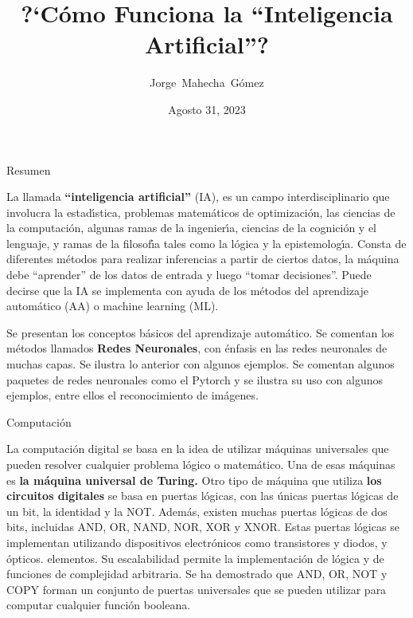 \documentclass[10pd,hyperref={colorlinks=true}]{beamer}
\title{\bf ?`C\'omo Funciona la ``Inteligencia Artificial''?}
\author[] %
{\scriptsize Jorge~Mahecha~G\'omez\inst{}
\vspace{-0.5cm}}
\institute{
\it Grupo de F\'{\i}sica At\'omica y Molecular\\
\it Instituto de F\'{\i}sica, Universidad de Antioquia\\
Medell\'{\i}n, Colombia\\
\texttt{jorge.mahecha@udea.edu.co}}
\date[Medell\'{\i}n] %
\date{\scriptsize Agosto 31, 2023}
\begin{document}

\begin{frame}
 \titlepage
\end{frame}


\begin{frame}{Resumen}

\vfill

La llamada {\bf ``inteligencia artificial''} (IA), es un campo 
interdisciplinario que involucra la estad\'{\i}stica, problemas 
matem\'aticos de optimizaci\'on, las ciencias de la computaci\'on, 
algunas ramas de la ingenier\'{\i}a, ciencias de la cognici\'on y el 
lenguaje, y ramas de la filosof\'{\i}a tales como la l\'ogica y la 
epistemolog\'{\i}a. Consta de diferentes m\'etodos para realizar 
inferencias a partir de ciertos datos, la m\'aquina debe ``aprender'' de 
los datos de entrada y luego ``tomar decisiones''. Puede decirse que la 
IA se implementa con ayuda de los m\'etodos del aprendizaje autom\'atico 
(AA) o machine learning (ML).

Se presentan los conceptos b\'asicos del aprendizaje autom\'atico. Se 
comentan los m\'etodos llamados {\bf Redes Neuronales}, con \'enfasis en 
las redes neuronales de muchas capas. Se ilustra lo anterior con algunos 
ejemplos. Se comentan algunos paquetes de redes neuronales como el 
Pytorch y se ilustra su uso con algunos ejemplos, entre ellos el 
reconocimiento de im\'agenes.

\vfill

 \end{frame}


 \begin{frame}{Computaci\'on}

La computaci\'on digital se basa en la idea de utilizar m\'aquinas 
universales que pueden resolver cualquier problema l\'ogico o 
matem\'atico. Una de esas m\'aquinas es {\bf la m\'aquina universal de 
Turing.} Otro tipo de m\'aquina que utiliza {\bf los circuitos 
digitales} se basa en puertas l\'ogicas, con las \'unicas puertas 
l\'ogicas de un bit, la identidad y la NOT. Adem\'as, existen muchas 
puertas l\'ogicas de dos bits, incluidas AND, OR, NAND, NOR, XOR y XNOR. 
Estas puertas l\'ogicas se implementan utilizando dispositivos 
electr\'onicos como transistores y diodos, y \'opticos. elementos. Su 
escalabilidad permite la implementaci\'on de l\'ogica y de funciones de 
complejidad arbitraria. Se ha demostrado que AND, OR, NOT y COPY forman 
un conjunto de puertas universales que se pueden utilizar para computar 
cualquier funci\'on booleana.

 \end{frame}
\end{document}
